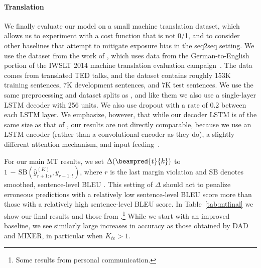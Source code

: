 \paragraph{Translation}
We finally evaluate our model on a small machine translation dataset, which allows us to experiment with a cost function that is not 0/1, and to consider other baselines that attempt to mitigate exposure bias in the seq2seq setting. We use the dataset from the work of , which uses data from the German-to-English portion of the IWSLT 2014 machine translation evaluation campaign~\cite{cettolo14report}. The data comes from translated TED talks, and the dataset contains roughly 153K training sentences, 7K development sentences, and 7K test sentences. We use the same preprocessing and dataset splits as , and like them we also use a single-layer LSTM decoder with 256 units. We also use dropout with a rate of 0.2 between each LSTM layer. We emphasize, however, that while our decoder LSTM is of the same size as that of , our results are not directly comparable, because we use an LSTM encoder (rather than a convolutional encoder as they do), a slightly different attention mechanism, and input feeding~\cite{luong15effective}.

For our main MT results, we set $\Delta(\beampred{t}{k})$ to $1 \,{-}\,\mathrm{SB}(\hat{y}_{r+1:t}^{({K})}, y_{r+1:t})$, where $r$ is the last margin violation and $\mathrm{SB}$ denotes smoothed, sentence-level BLEU \cite{chen14systematic}. This setting of $\Delta$ should act to penalize erroneous predictions with a relatively low sentence-level BLEU score more than those with a relatively high sentence-level BLEU score. In Table~\ref{tab:mtfinal} we show our final results and those from .\footnote{Some results from personal communication.} While we start with an improved baseline, we see similarly large increases in accuracy as those obtained by DAD and MIXER, in particular when $K_{te} > 1$. 

